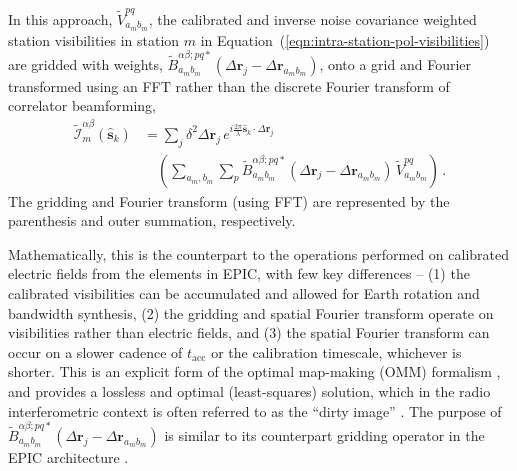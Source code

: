 \documentclass[
  journal=pasa,
  manuscript=article-type,
  year=2020,
  volume=37,
]{cup-journal}
\begin{document}
In this approach, $\widetilde{V}_{a_m b_m}^{pq}$, the calibrated and inverse noise covariance weighted station visibilities in station $m$ in Equation~(\ref{eqn:intra-station-pol-visibilities}) are gridded with weights, $\widetilde{B}_{a_m b_m}^{\alpha\beta;pq*}(\Delta\boldsymbol{r}_j-\Delta\boldsymbol{r}_{a_m b_m})$, onto a grid and Fourier transformed using an FFT rather than the discrete Fourier transform of correlator beamforming,
\begin{align}
  \widetilde{\mathcal{I}}_m^{\alpha\beta}(\hat{\boldsymbol{s}}_k) &= \sum_j \delta^2 \Delta\boldsymbol{r}_j \, e^{i\frac{2\pi}{\lambda} \hat{\boldsymbol{s}}_k\cdot\Delta\boldsymbol{r}_j} \nonumber\\
  &\quad \left(\sum_{a_m,b_m} \sum_p \widetilde{B}_{a_m b_m}^{\alpha\beta;pq*}(\Delta\boldsymbol{r}_j-\Delta\boldsymbol{r}_{a_m b_m}) \, \widetilde{V}_{a_m b_m}^{pq} \right) \, . \label{eqn:intra-station-pol-img-xfft-expl}
\end{align}
The gridding and Fourier transform (using FFT) are represented by the parenthesis and outer summation, respectively. 

Mathematically, this is the counterpart to the operations performed on calibrated electric fields from the elements in EPIC, with few key differences -- (1) the calibrated visibilities can be accumulated and allowed for Earth rotation and bandwidth synthesis, (2) the gridding and spatial Fourier transform operate on visibilities rather than electric fields, and (3) the spatial Fourier transform can occur on a slower cadence of $t_\textrm{acc}$ or the calibration timescale, whichever is shorter. This is an explicit form of the optimal map-making (OMM) formalism \citep{Tegmark1997a}, and provides a lossless and optimal (least-squares) solution, which in the radio interferometric context is often referred to as the ``dirty image'' \citep{TMS2017,SIRA-II}. The purpose of $\widetilde{B}_{a_m b_m}^{\alpha\beta;pq*}(\Delta\boldsymbol{r}_j-\Delta\boldsymbol{r}_{a_m b_m})$ is similar \citep{Morales+2009,Bhatnagar+2008} to its counterpart gridding operator in the EPIC architecture \citep{Morales2011}. 
\end{document}
